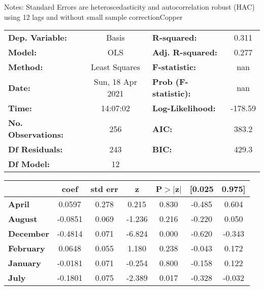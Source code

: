 Notes: \newline
 [1] Standard Errors are heteroscedasticity and autocorrelation robust (HAC) using 12 lags and without small sample correctionCopper\begin{center}
\begin{tabular}{lclc}
\toprule
\textbf{Dep. Variable:}    &      Basis       & \textbf{  R-squared:         } &     0.311   \\
\textbf{Model:}            &       OLS        & \textbf{  Adj. R-squared:    } &     0.277   \\
\textbf{Method:}           &  Least Squares   & \textbf{  F-statistic:       } &       nan   \\
\textbf{Date:}             & Sun, 18 Apr 2021 & \textbf{  Prob (F-statistic):} &      nan    \\
\textbf{Time:}             &     14:07:02     & \textbf{  Log-Likelihood:    } &   -178.59   \\
\textbf{No. Observations:} &         256      & \textbf{  AIC:               } &     383.2   \\
\textbf{Df Residuals:}     &         243      & \textbf{  BIC:               } &     429.3   \\
\textbf{Df Model:}         &          12      & \textbf{                     } &             \\
\bottomrule
\end{tabular}
\begin{tabular}{lcccccc}
                   & \textbf{coef} & \textbf{std err} & \textbf{z} & \textbf{P$> |$z$|$} & \textbf{[0.025} & \textbf{0.975]}  \\
\midrule
\textbf{April}     &       0.0597  &        0.278     &     0.215  &         0.830        &       -0.485    &        0.604     \\
\textbf{August}    &      -0.0851  &        0.069     &    -1.236  &         0.216        &       -0.220    &        0.050     \\
\textbf{December}  &      -0.4814  &        0.071     &    -6.824  &         0.000        &       -0.620    &       -0.343     \\
\textbf{February}  &       0.0648  &        0.055     &     1.180  &         0.238        &       -0.043    &        0.172     \\
\textbf{January}   &      -0.0181  &        0.071     &    -0.254  &         0.800        &       -0.158    &        0.122     \\
\textbf{July}      &      -0.1801  &        0.075     &    -2.389  &         0.017        &       -0.328    &       -0.032     \\

\end{tabular}
\end{center}
